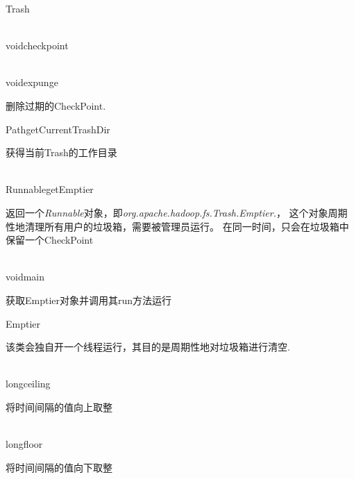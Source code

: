 \begin{XeClass}{Trash}
\begin{XeMethod}{\XePublic\\ }{void}{checkpoint}
  \end{XeMethod}

  \begin{XeMethod}{\XePublic\\ }{void}{expunge}
       
 删除过期的CheckPoint.

  \end{XeMethod}

  \begin{XeMethod}{}{Path}{getCurrentTrashDir}
       
 获得当前Trash的工作目录

  \end{XeMethod}

  \begin{XeMethod}{\XePublic\\ }{Runnable}{getEmptier}
       
 返回一个\emph{Runnable}对象，即\emph{org.apache.hadoop.fs.Trash.Emptier.}，
 这个对象周期性地清理所有用户的垃圾箱，需要被管理员运行。
 在同一时间，只会在垃圾箱中保留一个CheckPoint

  \end{XeMethod}

  \begin{XeMethod}{\XePublic\\ }{void}{main}
       
 获取Emptier对象并调用其run方法运行

  \end{XeMethod}

  \begin{XeInnerClass}{Emptier}
     
 该类会独自开一个线程运行，其目的是周期性地对垃圾箱进行清空.

    \begin{XeMethod}{\XePrivate\\ }{long}{ceiling}
         
 将时间间隔的值向上取整

    \end{XeMethod}

    \begin{XeMethod}{\XePrivate\\ }{long}{floor}
         
 将时间间隔的值向下取整

    \end{XeMethod}

  \end{XeInnerClass}
\end{XeClass}
